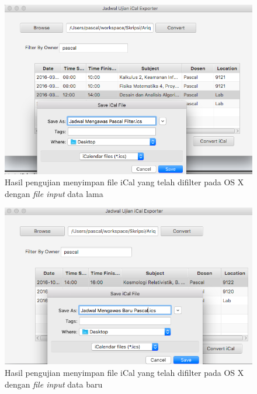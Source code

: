 		\begin{figure}[H]
			\centering
			\includegraphics[scale=0.5]{Gambar/Save-iCal-Filter-on-Mac}
			\caption{Hasil pengujian menyimpan file iCal yang telah difilter pada OS X dengan \textit{file input} data lama}
			\label{fig:Save-iCal-Filter-on-Mac}
			\end{figure}
		
		\begin{figure}[H]
			\centering
			\includegraphics[scale=0.5]{Gambar/Save-iCal-Data-Baru-Filter-on-Mac}
			\caption{Hasil pengujian menyimpan file iCal yang telah difilter pada OS X dengan \textit{file input} data baru}
			\label{fig:Save-iCal-Data-Baru-Filter-on-Mac}
			\end{figure}
			
